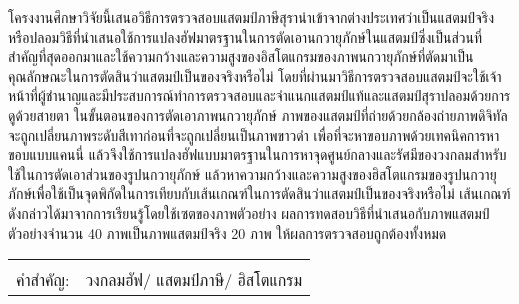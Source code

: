  \thaimainfont
\thaiabstract
โครงงานศึกษาวิจัยนี้เสนอวิธีการตรวจสอบแสตมป์ภาษีสุรานำเข้าจากต่างประเทศว่าเป็นแสตมป์จริงหรือปลอมวิธีที่นำเสนอใช้การแปลงฮัฟมาตรฐานในการตัดเอานกวายุภักษ์ในแสตมป์ซึ่งเป็นส่วนที่สำคัญที่สุดออกมาและใช้ความกว้างและความสูงของอิสโตแกรมของภาพนกวายุภักษ์ที่ตัดมาเป็นคุณลักษณะในการตัดสินว่าแสตมป์เป็นของจริงหรือไม่ โดยที่ผ่านมาวิธีการตรวจสอบแสตมป์จะใช้เจ้าหน้าที่ผู้ชำนาญและมีประสบการณ์ทำการตรวจสอบและจำแนกแสตมป์แท้และแสตมป์สุราปลอมด้วยการดูด้วยสายตา ในขั้นตอนของการตัดเอาภาพนกวายุภักษ์ ภาพของแสตมป์ที่ถ่ายด้วยกล้องถ่ายภาพดิจิทัล จะถูกเปลี่ยนภาพระดับสีเทาก่อนที่จะถูกเปลี่ยนเป็นภาพขาวดำ เพื่อที่จะหาขอบภาพด้วยเทคนิคการหาขอบแบบแคนนี่ แล้วจึงใช้การแปลงฮัฟแบบมาตรฐานในการหาจุดศูนย์กลางและรัศมีของวงกลมสำหรับใช้ในการตัดเอาส่วนของรูปนกวายุภักษ์ แล้วหาความกว้างและความสูงของฮิสโตแกรมของรูปนกวายุภักษ์เพื่อใช้เป็นจุดพิกัดในการเทียบกับเส้นเกณฑ์ในการตัดสินว่าแสตมป์เป็นของจริงหรือไม่ เส้นเกณฑ์ดังกล่าวได้มาจากการเรียนรู้โดยใช้เซตของภาพตัวอย่าง ผลการทดสอบวิธีที่นำเสนอกับภาพแสตมป์ตัวอย่างจำนวน  40 ภาพเป็นภาพแสตมป์จริง 20 ภาพ ให้ผลการตรวจสอบถูกต้องทั้งหมด

\begin{flushleft}
\begin{tabular*}{\textwidth}{@{}lp{}}
 & \\
คำสำคัญ: & วงกลมฮัฟ/ แสตมป์ภาษี/ ฮิสโตแกรม 
\\
\end{tabular*}
\end{flushleft}
\normalfont